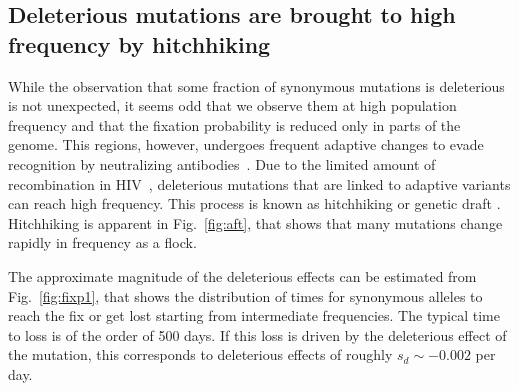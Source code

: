 \documentclass[rmp, twocolumn]{revtex4}
\newcommand{\FIG}[1]{Fig.~\ref{fig:#1}}
\begin{document}
\subsection{Deleterious mutations are brought to high frequency by hitchhiking}
While the observation that some fraction of synonymous mutations is deleterious
is not unexpected, it seems odd that we observe them at high population
frequency and that the fixation probability is reduced only in parts
of the genome.
This regions, however, undergoes frequent
adaptive changes to evade recognition by neutralizing 
antibodies~\cite{williamson_adaptation_2003,richman_rapid_2003}. Due to the 
limited amount of recombination in HIV~\cite{neher_recombination_2010,batorsky_estimate_2011},
deleterious mutations that are linked to adaptive variants can reach high
frequency. This process is known as hitchhiking \citep{smith_hitch-hiking_1974}
or genetic draft \citep{gillespie_genetic_2000,neher_genetic_2011}.
Hitchhiking is  apparent in \FIG{aft}, that shows that many mutations
change rapidly in frequency as a flock. 

The approximate magnitude of the deleterious effects can be estimated from
\FIG{fixp1}, that shows the distribution of times for synonymous
alleles to reach the fix or get lost starting from intermediate frequencies. The
typical time to loss is of the order of 500 days. If this loss is driven by the
deleterious effect of the mutation, this corresponds to deleterious effects of
roughly $s_d \sim - 0.002$ per day.
\end{document}
